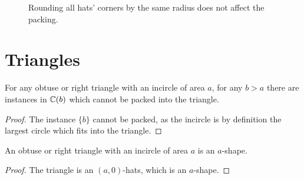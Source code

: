 \documentclass[%
    a4paper,              %
    style=print,          %
    bibliography=totoc,   %
    nexus,                %
    lnum,                 %
    extramargin,          %
]{tubsbook}
\begin{document}
%
%
%
\begin{figure}[htb]
    \centering


    \caption{Rounding all hats' corners by the same radius does not affect the packing.}
    \label{fig:rounding-hats}
\end{figure}

\chapter{Triangles}

\begin{theorem}
    For any obtuse or right triangle with an incircle of area $a$, for any $b > a$ there are instances in $\mathbb{C}(b)$ which cannot be packed into the triangle.
\end{theorem}

\begin{proof}
    The instance $\{b\}$ cannot be packed, as the incircle is by definition the largest circle which fits into the triangle.
\end{proof}

\begin{theorem}
    An obtuse or right triangle with an incircle of area $a$ is an $a$-shape.
\end{theorem}

\begin{proof}
    The triangle is an $(a,0)$-hats, which is an $a$-shape.
\end{proof}
\end{document}
